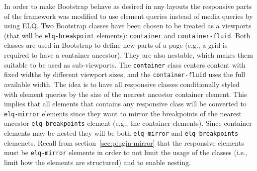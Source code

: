 \documentclass[a4paper,11pt]{kth-mag}
\newcommand{\code}[1]{\texttt{#1}}
\begin{document}
      In order to make Bootstrap behave as desired in any layouts the responsive parts of the framework was modified to use element queries instead of media queries by using \gls{ELQ}.
      Two Bootstrap classes have been chosen to be treated as a viewports (that will be \code{elq-breakpoint} elements): \code{container} and \code{container-fluid}.
      Both classes are used in Bootstrap to define new parts of a page (e.g., a grid is required to have a container ancestor).
      They are also nestable, which makes them suitable to be used as sub-viewports.
      The \code{container} class centers content with fixed widths by different viewport sizes, and the \code{container-fluid} uses the full available width.
      The idea is to have all responsive classes conditionally styled with element queries by the size of the nearest ancestor container element.
      This implies that all elements that contains any responsive class will be converted to \code{elq-mirror} elements since they want to mirror the breakpoints of the nearest ancestor \code{elq-breakpoints} element (e.g., the container elements).
      Since container elements may be nested they will be both \code{elq-mirror} and \code{elq-breakpoints} elemenets.
      Recall from section~\ref{sec:plugin-mirror} that the responsive elements must be \code{elq-mirror} elements in order to not limit the usage of the classes (i.e., limit how the elements are structured) and to enable nesting.
\end{document}
